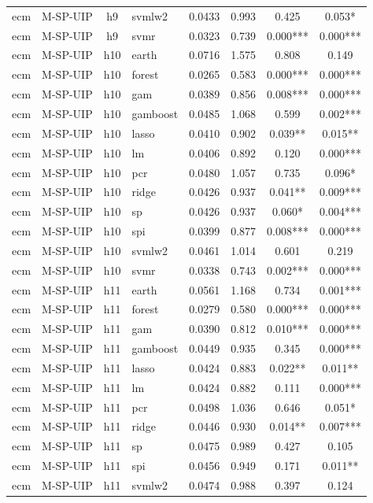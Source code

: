 \begin{ThreePartTable}
\begin{longtable}[t]{llclcccc}
ecm & M-SP-UIP & h9 & svmlw2 & 0.0433 & 0.993 & 0.425 & 0.053*\\
ecm & M-SP-UIP & h9 & svmr & 0.0323 & 0.739 & 0.000*** & 0.000***\\
\addlinespace
ecm & M-SP-UIP & h10 & earth & 0.0716 & 1.575 & 0.808 & 0.149\\
ecm & M-SP-UIP & h10 & forest & 0.0265 & 0.583 & 0.000*** & 0.000***\\
ecm & M-SP-UIP & h10 & gam & 0.0389 & 0.856 & 0.008*** & 0.000***\\
ecm & M-SP-UIP & h10 & gamboost & 0.0485 & 1.068 & 0.599 & 0.002***\\
ecm & M-SP-UIP & h10 & lasso & 0.0410 & 0.902 & 0.039** & 0.015**\\
ecm & M-SP-UIP & h10 & lm & 0.0406 & 0.892 & 0.120 & 0.000***\\
ecm & M-SP-UIP & h10 & pcr & 0.0480 & 1.057 & 0.735 & 0.096*\\
ecm & M-SP-UIP & h10 & ridge & 0.0426 & 0.937 & 0.041** & 0.009***\\
ecm & M-SP-UIP & h10 & sp & 0.0426 & 0.937 & 0.060* & 0.004***\\
ecm & M-SP-UIP & h10 & spi & 0.0399 & 0.877 & 0.008*** & 0.000***\\
ecm & M-SP-UIP & h10 & svmlw2 & 0.0461 & 1.014 & 0.601 & 0.219\\
ecm & M-SP-UIP & h10 & svmr & 0.0338 & 0.743 & 0.002*** & 0.000***\\
\addlinespace
ecm & M-SP-UIP & h11 & earth & 0.0561 & 1.168 & 0.734 & 0.001***\\
ecm & M-SP-UIP & h11 & forest & 0.0279 & 0.580 & 0.000*** & 0.000***\\
ecm & M-SP-UIP & h11 & gam & 0.0390 & 0.812 & 0.010*** & 0.000***\\
ecm & M-SP-UIP & h11 & gamboost & 0.0449 & 0.935 & 0.345 & 0.000***\\
ecm & M-SP-UIP & h11 & lasso & 0.0424 & 0.883 & 0.022** & 0.011**\\
ecm & M-SP-UIP & h11 & lm & 0.0424 & 0.882 & 0.111 & 0.000***\\
ecm & M-SP-UIP & h11 & pcr & 0.0498 & 1.036 & 0.646 & 0.051*\\
ecm & M-SP-UIP & h11 & ridge & 0.0446 & 0.930 & 0.014** & 0.007***\\
ecm & M-SP-UIP & h11 & sp & 0.0475 & 0.989 & 0.427 & 0.105\\
ecm & M-SP-UIP & h11 & spi & 0.0456 & 0.949 & 0.171 & 0.011**\\
ecm & M-SP-UIP & h11 & svmlw2 & 0.0474 & 0.988 & 0.397 & 0.124\\

\end{longtable}
\end{ThreePartTable}
